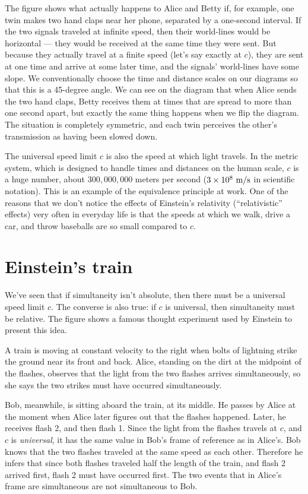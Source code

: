 The figure shows what actually happens to Alice and Betty if, for example, one twin makes two hand claps
near her phone, separated by a one-second interval. If the two signals traveled at infinite speed, then
their world-lines would be horizontal --- they would be received at the same time they were sent. But because
they actually travel at a finite speed (let's say exactly at $c$),
they are sent at one time and arrive at some later time, and
the signals' world-lines have some slope. We conventionally choose the time and distance scales on our diagrams
so that this is a 45-degree angle. We can see on the diagram that when Alice sends the two hand claps, Betty
receives them at times that are spread to more than one second apart, but exactly the same thing happens when
we flip the diagram. The situation is completely symmetric, and each twin perceives the other's transmission as
having been slowed down.

The universal speed limit $c$ is also the speed at which light travels. In the metric system, which is designed to
handle times and distances on the human scale, $c$ is a huge number, about $300,000,000$ meters per second 
($3\times10^8\ \zu{m}/\zu{s}$ in scientific notation). This is an example of the equivalence principle at
work. One of the reasons that we don't notice the effects of Einstein's relativity (``relativistic'' effects)
very often in everyday life is that the speeds at which we walk, drive a car, and throw baseballs are
so small compared to $c$.

\section{Einstein's train}\label{sec:einstein-train}

We've seen that if simultaneity isn't absolute, then there must be a universal speed limit $c$.
The converse is also true: if $c$ is universal, then simultaneity must be relative.
The figure shows a famous thought experiment used by Einstein to present this idea.




A train is moving at constant velocity to the right when bolts of lightning
strike the ground near its front and back. Alice, standing on the dirt at
the midpoint of the flashes, observes that the light from the two flashes
arrives simultaneously, so she says the two strikes must have occurred
simultaneously.

Bob, meanwhile, is sitting aboard the train, at its middle.
He passes by Alice at the moment when Alice later figures out that the
flashes happened. Later, he receives flash 2, and then flash 1. Since the light
from the flashes travels at $c$, and $c$ is \emph{universal}, it has the same
value in Bob's frame of reference as in Alice's. Bob knows that the two flashes
traveled at the same speed as each other. Therefore he infers
that since both flashes traveled half the length of the train, and flash 2 arrived first,
flash 2 must
have occurred first. The two events that in Alice's frame are simultaneous
are not simultaneous to Bob.

